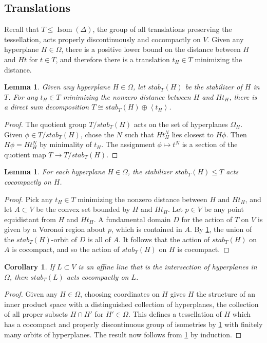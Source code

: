 \documentclass[11pt]{amsart}
\newtheorem{lemma}[theorem]{Lemma}
\newtheorem{corollary}[theorem]{Corollary}
\numberwithin{table}{section}
\numberwithin{figure}{section}
\theoremstyle{remark}
\providecommand{\cyc}[1]{\left\langle#1\right\rangle}
\DeclareMathOperator{\Isom}{Isom}
\begin{document}
\subsection{Translations} Recall that $T\leq \Isom(\Delta)$, the
group of all translations preserving the tessellation, acts properly
discontinuously and cocompactly on $V$. Given any hyperplane $H\in
\Omega$, there is a positive lower bound on the distance between $H$
and $Ht$ for $t\in T$, and therefore there is a translation $t_H\in T$
minimizing the distance.

\begin{lemma} \label{lem:stab-decomp}
  Given any hyperplane $H\in \Omega$, let $stab_T(H)$ be the
  stabilizer of $H$ in $T$. For any $t_H\in T$ minimizing the nonzero
  distance between $H$ and $Ht_H$, there is a direct sum decomposition
  $T \cong stab_T(H) \oplus \cyc{t_H}$.
\end{lemma}
\begin{proof}
  The quotient group $T / stab_T(H)$ acts on the set of hyperplanes
  $\Omega_H$. Given $\phi \in T/ stab_T(H)$, chose the $N$
  such that $H t_H^N$ lies closest to $H \phi$. Then $H \phi = H t_H^N$
  by minimality of $t_H$. The assignment $\phi \mapsto t^N$ is a
  section of the quotient map $T \to T/stab_T(H)$.
\end{proof}

\begin{lemma} \label{lem:trans-hyperplane}
  For each hyperplane $H\in \Omega$, the stabilizer $stab_T(H) \leq T$
  acts cocompactly on $H$. 
\end{lemma}
\begin{proof}
  Pick any $t_H\in T$ minimizing the nonzero distance between $H$ and
  $Ht_H$, and let $A \subset V$ be the convex set bounded by $H$ and
  $H t_H$. Let $p\in V$ be any point equidistant from $H$ and $H
  t_H$. A fundamental domain $D$ for the action of $T$ on $V$ is given
  by a Voronoi region about $p$, which is contained in $A$. By
  \cref{lem:stab-decomp}, the union of the $stab_T(H)$-orbit of $D$ is
  all of $A$. It follows that the action of $stab_T(H)$ on $A$ is
  cocompact, and so the action of $stab_T(H)$ on $H$ is cocompact.
\end{proof}

\begin{corollary} \label{cor:line-trans}
  If $L\subset V$ is an affine line that is the intersection of
  hyperplanes in $\Omega$, then $stab_T(L)$ acts cocompactly on $L$.
\end{corollary}
\begin{proof}
  Given any $H\in \Omega$, choosing coordinates on $H$ gives $H$ the
  structure of an inner product space with a distinguished collection
  of hyperplanes, the collection of all proper subsets $H\cap H'$ for
  $H'\in \Omega$. This defines a tessellation of $H$ which has a
  cocompact and properly discontinuous group of isometries by
  \cref{lem:trans-hyperplane} with finitely many orbits of
  hyperplanes. The result now follows from \cref{lem:trans-hyperplane}
  by induction.
\end{proof}
\end{document}
